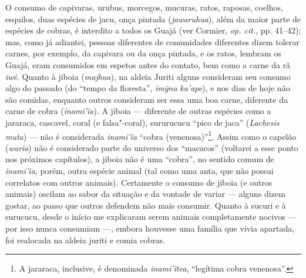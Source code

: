 O consumo de capivaras, urubus, morcegos, mucuras, ratos, raposas,
coelhos, esquilos, duas espécies de jacu, onça pintada
(\emph{jawaruhua}), além da maior parte de espécies de cobras, é
interdito a todos os Guajá (ver Cormier, \emph{op. cit.}, pp. 41--42); mas, como
já adiantei, pessoas diferentes de comunidades diferentes dizem tolerar
carnes, por exemplo, da capivara ou da onça pintada, e os ratos, lembram
os Guajá, eram consumidos em espetos antes do contato, bem como a carne
da rã \emph{iwê}. Quanto à jiboia (\emph{majhua}), na aldeia Juriti
alguns consideram seu consumo algo do passado (do ``tempo da floresta'',
\emph{imỹna} \emph{ka'ape}), e nos dias de hoje não são comidas,
enquanto outros consideram ser essa uma boa carne, diferente da carne de
cobra (\emph{inami'ĩa}). A jiboia --- diferente de outras espécies como a
jararaca, cascavel, coral (e falsa"-coral), sururucucu ``pico de jaca''
(\emph{Lachesis muta}) --- não é considerada \emph{inami'ĩa} ``cobra
(venenosa)''\footnote{A jararaca, inclusive, é denominada
  \emph{inami'ĩtea}, ``legítima cobra venenosa''.}. Assim como o capelão
(\emph{waria}) não é considerado parte do universo dos ``macacos''
(voltarei a esse ponto nos próximos capítulos), a jiboia não é uma
``cobra'', no sentido comum de \emph{inami'ĩa}, porém, outra espécie
animal (tal como uma anta, que não possui correlatos com outros
animais). Certamente o consumo de jiboia (e outros animais) oscilam ao
sabor da situação e da vontade de variar --- alguns dizem gostar, ao passo
que outros defendem não mais consumir. Quanto à sucuri e à surucucu,
desde o início me explicaram serem animais completamente nocivos --- por
isso nunca consumiam ---, embora houvesse uma família que vivia apartada,
foi realocada na aldeia juriti e comia cobras.

